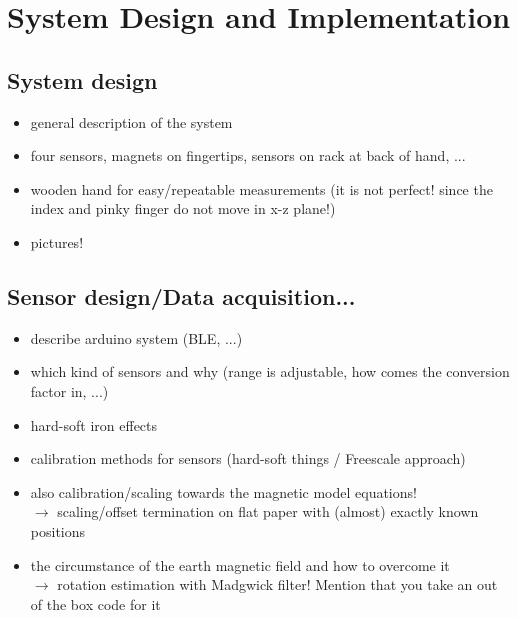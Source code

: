 \lhead[\chaptername~\thechapter]{\rightmark}

\rhead[\leftmark]{}

\lfoot[\thepage]{}

\cfoot{}

\rfoot[]{\thepage}

\chapter{System Design and Implementation} \label{cha:sysDesign}

\section{System design} \label{cha:design}

\begin{itemize}
\item general description of the system
\item four sensors, magnets on fingertips, sensors on rack at back of hand, ...
\item wooden hand for easy/repeatable measurements (it is not perfect! since the index and pinky finger do not move in x-z plane!)
\item pictures!
\end{itemize}


\section{Sensor design/Data acquisition...} \label{cha:sensors}

\begin{itemize}
\item describe arduino system (BLE, ...)
\item which kind of sensors and why (range is adjustable, how comes the conversion factor in, ...)
\item hard-soft iron effects
\item calibration methods for sensors (hard-soft things / Freescale approach)
\item also calibration/scaling towards the magnetic model equations! \\
		$ \rightarrow $ scaling/offset termination on flat paper with (almost) exactly known positions
\item the circumstance of the earth magnetic field and how to overcome it \\
		$ \rightarrow $ rotation estimation with Madgwick filter! Mention that you take an out of the box code for it
\end{itemize}


